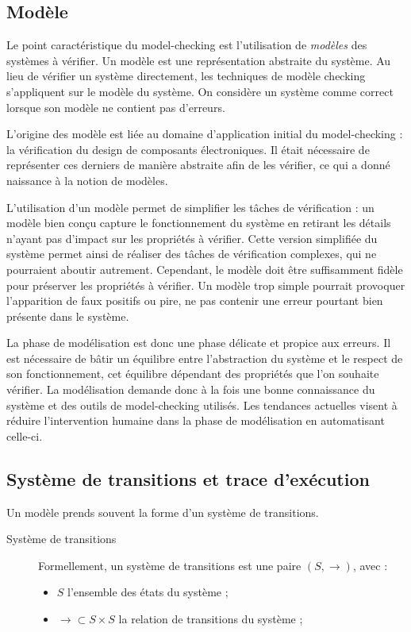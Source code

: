 \subsection{Modèle}


Le point caractéristique du model-checking est l'utilisation de
\emph{modèles} des systèmes à vérifier. Un modèle est une représentation
abstraite du système. Au lieu de vérifier un système directement, les techniques
de modèle checking s'appliquent sur le modèle du système. On considère un
système comme correct lorsque son modèle ne contient pas d'erreurs.

L'origine des modèle est liée au domaine d'application initial du
model-checking : la vérification du design de composants électroniques. Il
était nécessaire de représenter ces derniers de manière abstraite afin de les
vérifier, ce qui a donné naissance à la notion de modèles.

L'utilisation d'un modèle permet de simplifier les tâches de vérification : un
modèle bien conçu capture le fonctionnement du système en retirant les détails
n'ayant pas d'impact sur les propriétés à vérifier. Cette version simplifiée du
système permet ainsi de réaliser des tâches de vérification complexes, qui ne
pourraient aboutir autrement. Cependant, le modèle doit être suffisamment fidèle
pour préserver les propriétés à vérifier. Un modèle trop simple pourrait
provoquer l'apparition de faux positifs ou pire, ne pas contenir une erreur
pourtant bien présente dans le système.

La phase de modélisation est donc une phase délicate et propice aux erreurs. Il
est nécessaire de bâtir un équilibre entre l'abstraction du système et le
respect de son fonctionnement, cet équilibre dépendant des propriétés que l'on
souhaite vérifier. La modélisation demande donc à la fois une bonne connaissance
du système et des outils de model-checking utilisés. Les tendances actuelles
visent à réduire l'intervention humaine dans la phase de modélisation en
automatisant celle-ci.

\subsection{Système de transitions et trace d'exécution}

Un modèle prends souvent la forme d'un système de transitions.

\begin{description}
\item[Système de transitions]
  Formellement, un système de transitions est une paire \((S, \rightarrow)\),
  avec :

\begin{itemize}
\item
  \(S\) l'ensemble des états du système ;
\item
  \(\rightarrow \subset S \times S\) la relation de transitions du
  système ;
\end{itemize}
\end{description}

